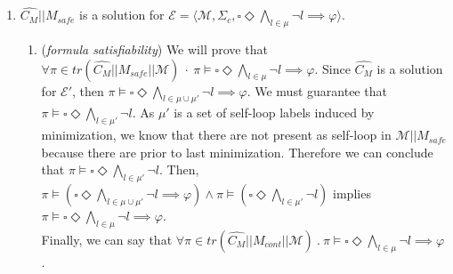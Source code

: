 \begin{enumerate}
    \item $\hat{C_{M}} || M_{safe}$ is a solution for $\mathcal{E} = \langle \mathcal{M}, \Sigma_c, \square \Diamond \bigwedge_{l \in \mu} \neg l \implies \varphi \rangle$.

    \begin{enumerate}
        \item (\textit{formula satisfiability}) We will prove that $\forall \pi \in tr(\hat{C_{M}} || M_{safe}||\mathcal{M}) \ \cdot \ \pi \vDash \square \Diamond \bigwedge_{l \in \mu} \neg l \implies \varphi$. Since $\hat{C_M}$ is a solution for $\mathcal{E'}$, then $\pi \vDash \square \Diamond \bigwedge_{l \in \mu \cup \mu'} \neg l \implies \varphi$. We must guarantee that $\pi \vDash \square \Diamond \bigwedge_{l \in \mu'} \neg l$. As $\mu'$ is a set of self-loop labels induced by minimization, we know that there are not present as self-loop in $\mathcal{M}||M_{safe}$ because there are prior to last minimization. Therefore we can conclude that $\pi \vDash \square \Diamond \bigwedge_{l \in \mu'} \neg l$.
        Then, $\pi \vDash (\square \Diamond \bigwedge_{l \in \mu \cup \mu'} \neg l \implies \varphi) \wedge \pi \vDash (\square \Diamond \bigwedge_{l \in \mu'} \neg l)$ implies $\pi \vDash \square \Diamond \bigwedge_{l \in \mu} \neg l \implies \varphi$. \\
        Finally, we can say that $\forall \pi \in tr(\hat{C_M} || M_{cont} || \mathcal{M}) \ . \ \pi \vDash \square \Diamond \bigwedge_{l \in \mu} \neg l \implies \varphi$. \\
       

\end{enumerate}
\end{enumerate}
